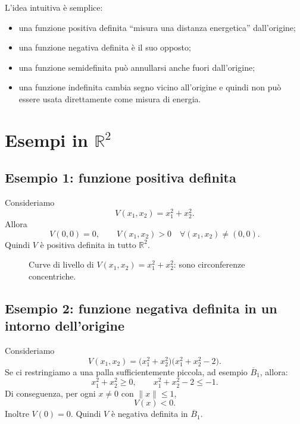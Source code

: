 \medskip

\noindent
L'idea intuitiva è semplice:
\begin{itemize}
    \item una funzione positiva definita ``misura una distanza energetica'' dall'origine;
    \item una funzione negativa definita è il suo opposto;
    \item una funzione semidefinita può annullarsi anche fuori dall'origine;
    \item una funzione indefinita cambia segno vicino all'origine e quindi non può essere usata direttamente come misura di energia.
\end{itemize}

\section{Esempi in \(\mathbb{R}^2\)}

\subsection*{Esempio 1: funzione positiva definita}
Consideriamo
\[
V(x_1,x_2)=x_1^2+x_2^2.
\]
Allora
\[
V(0,0)=0,
\qquad
V(x_1,x_2)>0 \quad \forall (x_1,x_2)\neq (0,0).
\]
Quindi \(V\) è positiva definita in tutto \(\mathbb{R}^2\).

\begin{figure}[h!]
\centering
{}
\caption{Curve di livello di \(V(x_1,x_2)=x_1^2+x_2^2\): sono circonferenze concentriche.}
\end{figure}

\subsection*{Esempio 2: funzione negativa definita in un intorno dell'origine}
Consideriamo
\[
V(x_1,x_2)=\bigl(x_1^2+x_2^2\bigr)\bigl(x_1^2+x_2^2-2\bigr).
\]
Se ci restringiamo a una palla sufficientemente piccola, ad esempio \(\overline{B}_1\), allora:
\[
x_1^2+x_2^2 \ge 0,
\qquad
x_1^2+x_2^2-2 \le -1.
\]
Di conseguenza, per ogni \(x\neq 0\) con \(\|x\|\le 1\),
\[
V(x)<0.
\]
Inoltre \(V(0)=0\). Quindi \(V\) è negativa definita in \(\overline{B}_1\).

